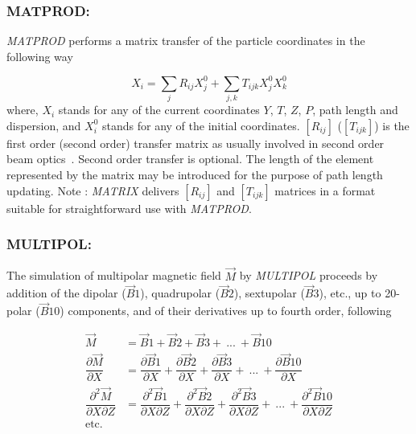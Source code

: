 \newpage

\subsubsection*{MATPROD:  \MATPRODTitl}\label{MATPROD}
\medskip

\textsl{MATPROD} performs a matrix transfer of the particle coordinates 
in the following way 

$$ X_i = \sum_j R_{ij}X^0_j + \sum_{j,k} T_{ijk}X^0_jX^0_k $$
%
 where, $ X_i $ stands for any of the current coordinates $ Y$, $T$, $Z$, $P $, path length and dispersion, and $ X^0_i $ stands for any of the initial coordinates.
$[R_{ij}]$ ($[T_{ijk}]$) is the first order (second order) 
transfer matrix as usually involved in second order beam optics~\cite{Biblio10}.      %
Second order transfer is optional.  The length of the element represented by 
the matrix may be introduced for the purpose of path length updating.  
\medskip
Note : \textsl{MATRIX} delivers $[R_{ij}]$ and $[T_{ijk}]$ matrices in a format 
suitable for straightforward use with \textsl{MATPROD}.

\newpage

\subsubsection*{MULTIPOL:  \MULTIPOLTitl} \label{MULTIPOL}

The simulation of  multipolar magnetic field $ \vec  M $ by \textsl{MULTIPOL}  proceeds 
by addition of the dipolar  ($\vec  B1$),  quadrupolar ($ \vec  B2 $), sextupolar 
($ \vec  B3 $), etc., up to 20-polar  ($\vec  B10$) 
components, and of their derivatives up to fourth order, following

\begin{align*}
	\vec  M &   =   \vec B1+\vec  B2+\vec  B3+ \ ...\ +\vec  B10  \\ 
	\dfrac{ \partial\vec M }{ \partial X} 
	        &   = \dfrac{ \partial\vec  B1}{ \partial X} + 
	        \dfrac{\partial\vec  B2 }{ \partial X} + 
	        \dfrac{\partial\vec  B3}{ \partial X} + 
                            \ ...\ +
	        \dfrac{\partial\vec  B10 }{ \partial X} \\
	\dfrac{ \partial^ 2\vec  M }{ \partial X\partial Z} 
	       & = \dfrac{ \partial^ 2\vec  B1 }{ \partial X\partial Z} + 
	       \dfrac{\partial^ 2\vec  B2 }{ \partial X\partial Z} + 
	       \dfrac{\partial^ 2\vec  B3}{ \partial X\partial Z} + 
                            \ ...\ +
 	       \dfrac{\partial^ 2\vec  B10}{ \partial X\partial Z} \\
	\text{etc. } &
\end{align*}


